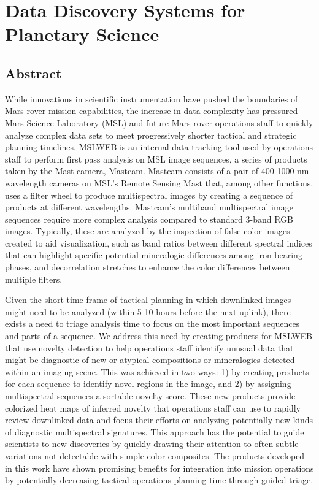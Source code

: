 \chapter[Data Discovery Systems for Planetary Science]{Data Discovery Systems for Planetary Science}
\section{Abstract}
While innovations in scientific instrumentation have pushed the boundaries of Mars rover mission capabilities, the increase in data complexity has pressured Mars Science Laboratory (MSL) and future Mars rover operations staff to quickly analyze complex data sets to meet progressively shorter tactical and strategic planning timelines. 
MSLWEB is an internal data tracking tool used by operations staff to perform first pass analysis on MSL image sequences, a series of products taken by the Mast camera, Mastcam. Mastcam consists of a pair of 400-1000 nm wavelength cameras on MSL's Remote Sensing Mast that, among other functions, uses a filter wheel to produce multispectral images by creating a sequence of products at different wavelengths. 
Mastcam's multiband multispectral image sequences require more complex analysis compared to standard 3-band RGB images. 
Typically, these are analyzed by the inspection of false color images created to aid visualization, such as band ratios between different spectral indices that can highlight specific potential mineralogic differences among iron-bearing phases, and decorrelation stretches to enhance the color differences between multiple filters. 

Given the short time frame of tactical planning in which downlinked images might need to be analyzed (within 5-10 hours before the next uplink), there exists a need to triage analysis time to focus on the most important sequences and parts of a sequence. 
We address this need by creating products for MSLWEB that use novelty detection to help operations staff identify unusual data that might be diagnostic of new or atypical compositions or mineralogies detected within an imaging scene. 
This was achieved in two ways: 1) by creating products for each sequence to identify novel regions in the image, and 2) by assigning multispectral sequences a sortable novelty score. 
These new products provide colorized heat maps of inferred novelty that operations staff can use to rapidly review downlinked data and focus their efforts on analyzing potentially new kinds of diagnostic multispectral signatures. 
This approach has the potential to guide scientists to new discoveries by quickly drawing their attention to often subtle variations not detectable with simple color composites.
The products developed in this work have shown promising benefits for integration into mission operations by potentially decreasing tactical operations planning time through guided triage.
